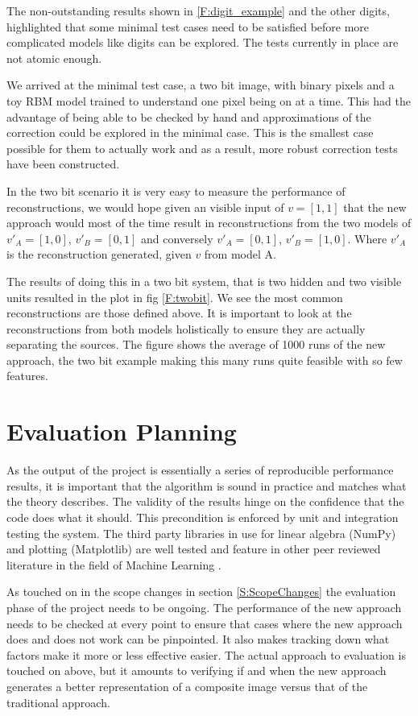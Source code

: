 The non-outstanding results shown in \ref{F:digit_example} and the other digits, highlighted that some minimal test cases need to be satisfied before more complicated models like digits can be explored. The tests currently in place are not atomic enough. 

We arrived at the minimal test case, a two bit image, with binary pixels and a toy RBM model trained to understand one pixel being on at a time. This had the advantage of being able to be checked by hand and approximations of the correction could be explored in the minimal case. This is the  smallest case possible for them to actually work and as a result, more robust correction tests have been constructed. 

In the two bit scenario it is very easy to measure the performance of reconstructions, we would hope given an visible input of $ v = [1,1] $ that the new approach would most of the time result in reconstructions from the two models of $ v'_A = [1,0]$,  $v'_B = [0,1] $ and conversely $ v'_A = [0,1]$,  $v'_B = [1,0] $. Where $v'_A$ is the reconstruction generated, given $v$ from model A. 

The results of doing this in a two bit system, that is two hidden and two visible units resulted in the plot in fig \ref{F:twobit}. We see the most common reconstructions are those defined above. It is important to look at the reconstructions from both models holistically to ensure they are actually separating the sources. The figure shows the average of 1000 runs of the new approach, the two bit example making this many runs quite feasible with so few features.


\section{Evaluation Planning}\label{S:evaluation}

As the output of the project is essentially a series of reproducible performance results, it is important that the algorithm is sound in practice and matches what the theory describes. The validity of the results hinge on the confidence that the code does what it should. This precondition is enforced by unit and integration testing the system. The third party libraries in use for linear algebra (NumPy) and plotting (Matplotlib) are well tested and feature in other peer reviewed literature in the field of Machine Learning \cite{Millman:2011wp}.

As touched on in the scope changes in section \ref{S:ScopeChanges} the evaluation phase of the project needs to be ongoing. The performance of the new approach needs to be checked at every point to ensure that cases where the new approach does and does not work can be pinpointed. It also makes tracking down what factors make it more or less effective easier.
The actual approach to evaluation is touched on above, but it amounts to verifying if and when the new approach generates a better representation of a composite image versus that of the traditional approach.